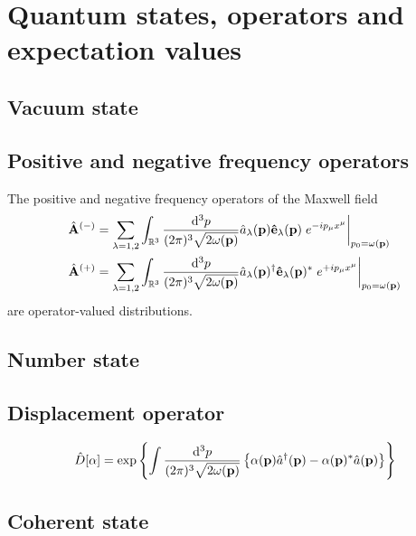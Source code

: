 \section{Quantum states, operators and expectation values}

\subsection{Vacuum state}

\subsection{Positive and negative frequency operators}


The positive and negative frequency operators of the Maxwell field
\begin{align}
	\hat{\vb{A}}^{(-)}
	&=
	\sum_{\lambda=1,2}
	\int_{\mathbb{R}^3}
	\frac{\dd[3]{p}}{(2\pi)^3\sqrt{2\omega(\vb{p})}}
	\hat{a}_\lambda(\vb{p})
	\vu{e}_\lambda(\vb{p})
	\eval{e^{-ip_\mu x^\mu}}_{p_0=\omega(\vb{p})}
	\\
	\hat{\vb{A}}^{(+)}
	&=
	\sum_{\lambda=1,2}
	\int_{\mathbb{R}^3}
	\frac{\dd[3]{p}}{(2\pi)^3\sqrt{2\omega(\vb{p})}}
	\hat{a}_\lambda(\vb{p})^\dagger
	\vu{e}_\lambda(\vb{p})^*
	\eval{e^{+ip_\mu x^\mu}}_{p_0=\omega(\vb{p})}
\end{align}
are operator-valued distributions.

\subsection{Number state}

\subsection{Displacement operator}

\begin{equation}
	\hat{D}[\alpha]
	=
	\exp\left\{
		\int\frac{\dd[3]{p}}{(2\pi)^3\sqrt{2\omega(\vb{p})}}
		\left\{
			\alpha(\vb{p})
			\hat{a}^\dagger(\vb{p})
			-
			\alpha(\vb{p})^*
			\hat{a}(\vb{p})
		\right\}
	\right\}
\end{equation}

\subsection{Coherent state}

